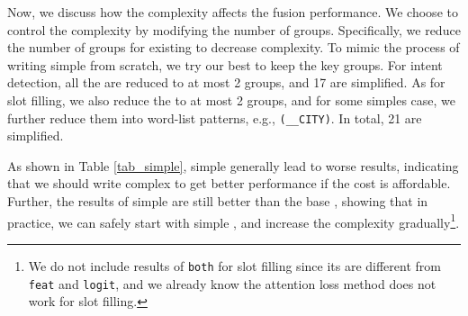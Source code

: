Now, we discuss how the \RE complexity affects the fusion performance.
We choose to control the \RE complexity by modifying the number of groups.
%
Specifically, we reduce the number of groups for existing \REs to decrease \RE complexity.
To mimic the process of writing simple \REs from scratch, we try our best to keep the key \RE groups.
For intent detection, all the \REs are reduced to at most 2 groups, %
and 17 \REs are simplified.
As for slot filling, we also reduce the \REs to at most 2 groups, and for some simples case, we further reduce them into  word-list patterns, e.g., \texttt{(\_\_CITY)}. In total, 21 \REs are simplified.

As shown in Table \ref{tab_simple}, simple \REs generally lead to worse results, indicating that we should write complex \REs to get better performance if the cost is affordable.
Further, the results of simple \REs are still better than the base \BLSTM, showing that in practice, we can safely start with simple \REs, and increase the complexity gradually\footnote{
We do not include results of \texttt{both} for slot filling since its \REs are different from \texttt{feat} and \texttt{logit}, and we already know the attention loss method does not work for slot filling.}.

